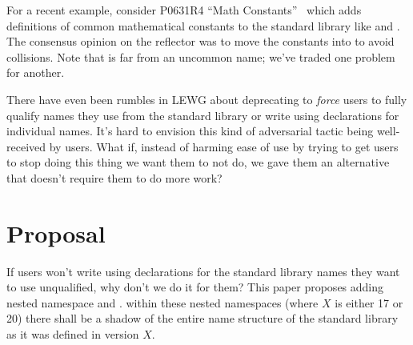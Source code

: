 For a recent example, consider P0631R4 ``Math Constants''~\cite{P0631R4} which
adds definitions of common mathematical constants to the standard library like
 and . The consensus opinion on the reflector was to move the
constants into  to avoid collisions. Note that  is
far from an uncommon name; we've traded one problem for another.

There have even been rumbles in LEWG about deprecating
 to \emph{force} users to fully qualify names they
use from the standard library or write using declarations for individual names.
It's hard to envision this kind of adversarial tactic being well-received by
users. What if, instead of harming ease of use by trying to get users to stop
doing this thing we want them to not do, we gave them an alternative that
doesn't require them to do more work?


\chapter{Proposal}
If users won't write using declarations for the standard library names they
want to use unqualified, why don't we do it for them? This paper proposes adding
nested namespace  and . within these
nested namespaces  (where $X$ is either 17 or 20) there
shall be a shadow of the entire name structure of the standard library as it was
defined in \Cpp{} version $X$.

